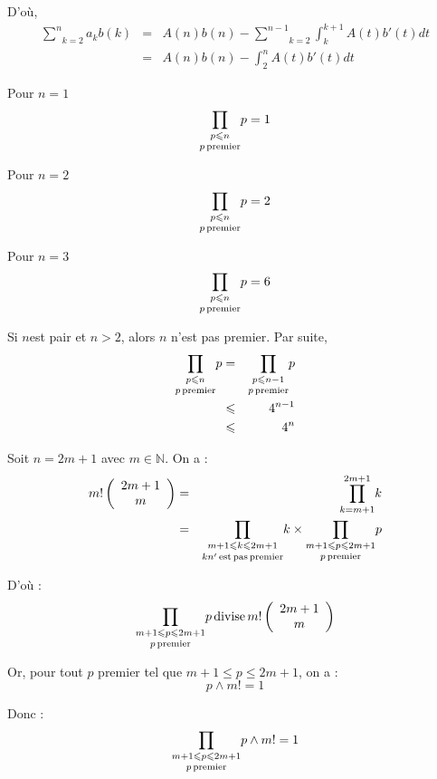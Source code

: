 D'o{\`u},
\begin{eqnarray*}
  \underset{k = 2}{\overset{n}{\sum}} a_k b (k) & = & A (n) b (n) -
  \underset{k = 2}{\overset{n - 1}{\sum}} \int^{k + 1}_k A (t) b' (t) d t\\
  & = & A (n) b (n) - \int^n_2 A (t) b' (t) d t
\end{eqnarray*}



Pour $n = 1$
\[ \underset{p \operatorname{premier}}{\underset{p \leqslant n}{\prod}} p = 1 \]


Pour $n = 2$
\[ \underset{p \operatorname{premier}}{\underset{p \leqslant n}{\prod}} p = 2 \]


Pour $n = 3$
\[ \underset{p \operatorname{premier}}{\underset{p \leqslant n}{\prod}} p = 6 \]


 Si $n$est pair et $n > 2$, alors $n$ n'est pas premier. Par
suite,
\begin{eqnarray*}
  \underset{p \operatorname{premier}}{\underset{p \leqslant n}{\prod}} p & = &
  \underset{p \operatorname{premier}}{\underset{p \leqslant n - 1}{\prod}} p\\
  & \leqslant & 4^{n - 1}\\
  & \leqslant & 4^n
\end{eqnarray*}


 Soit $n = 2 m + 1$ avec $m \in \mathbb{N}$. On a :
\begin{eqnarray*}
  m! \left( \begin{array}{c}
    2 m + 1\\
    m
  \end{array} \right) & = & \underset{k = m + 1}{\overset{2 m + 1}{\prod}} k\\
  & = & \underset{k n' \operatorname{est} \operatorname{pas} \operatorname{premier}}{\underset{m + 1
  \leqslant k \leqslant 2 m + 1}{\prod}} k \times \underset{p
  \operatorname{premier}}{\underset{m + 1 \leqslant p \leqslant 2 m + 1}{\prod}} p
\end{eqnarray*}


D'o{\`u} :
\[ \underset{p \operatorname{premier}}{\underset{m + 1 \leqslant p \leqslant 2 m +
   1}{\prod}} p \operatorname{divise} m! \left( \begin{array}{c}
     2 m + 1\\
     m
   \end{array} \right) \]


Or, pour tout $p$ premier tel que $m + 1 \leqslant p \leqslant 2 m + 1$, on a
:
\[ p \wedge m! = 1 \]


Donc :
\[ \underset{p \operatorname{premier}}{\underset{m + 1 \leqslant p \leqslant 2 m +
   1}{\prod}} p \wedge m! = 1 \]


